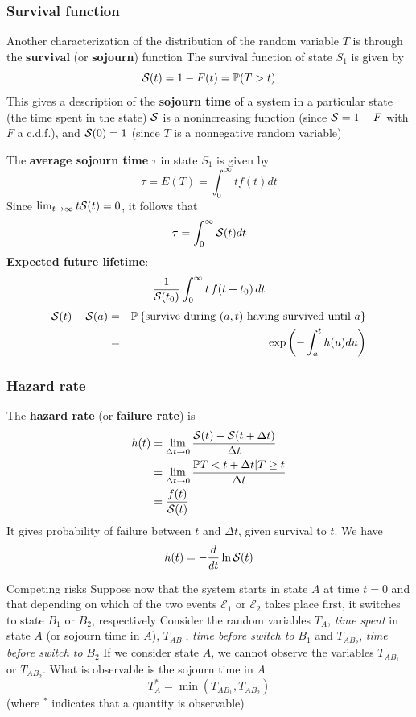 \documentclass[aspectratio=169]{beamer}\usepackage[]{graphicx}\usepackage[]{xcolor}
\begin{document}
\begin{frame}\frametitle{Survival function}
Another characterization of the distribution of the random variable
$T$ is through the \textbf{survival} (or \textbf{sojourn}) function
\vfill
The survival function of state $S_1$ is given by 
\begin{equation}
  \S(t)=1-F(t)=\IP(T>t)
  \label{eq:survival}
\end{equation}
This gives a description of the \textbf{sojourn time} of a
system in a particular state (the time spent in the state)
\vfill
$\S$ is a nonincreasing function (since $\S=1-F$
with $F$ a c.d.f.), and
$\S(0)=1$ (since $T$ is a nonnegative random variable)
\end{frame}

\begin{frame}
The \textbf{average sojourn time} $\tau$ in state $S_1$ is given by
\[
\tau=E(T)=\int_0^\infty tf(t)dt
\]
Since $\lim_{t\to\infty}t\S(t)=0$, it follows that 
\[
\tau=\int_0^\infty \S(t)dt
\]
\vfill
\textbf{Expected future lifetime}:
\[
\frac{1}{\S(t_0)} \int_0^{\infty} t\,f(t+t_0)\,dt 
\]
\vfill
\begin{eqnarray*}
\S(t)-\S(a)&=&\IP\left\{\textrm{survive during }
 (a,t)\textrm{ having survived until }a\right\} \\
&=& \exp\left(-\int_a^t h(u)du\right)
\end{eqnarray*}
\end{frame}

\begin{frame}\frametitle{Hazard rate}
The \textbf{hazard rate} (or \textbf{failure rate}) is
\begin{align*}
h(t) &= \lim_{\Delta t\to 0}\frac{\S(t)-\S(t+\Delta t)}{\Delta t} \\
& = \lim_{\Delta t\to 0} \frac{\IP{ T<t+\Delta t | T\geq
t}}{\Delta t} \\
&= \frac{f(t)}{\S(t)}
\end{align*}
It gives probability of failure between $t$ and $\Delta t$, given survival to $t$.
\vfill
We have
\[
h(t)=-\frac{d}{dt}\ln\S(t)
\]
\end{frame}

\begin{frame}{Competing risks}
Suppose now that the system starts in state $A$ at time $t=0$ and that depending on which of the two events $\mathcal{E}_1$ or $\mathcal{E}_2$ takes place first, it switches to state $B_1$ or $B_2$, respectively
\vfill
Consider the random variables $T_A$, \emph{time spent} in state $A$ (or sojourn time in $A$), $T_{AB_1}$, \emph{time before switch to} $B_1$ and $T_{AB_2}$, \emph{time before switch to} $B_2$
\vfill
If we consider state $A$, we cannot observe the variables $T_{AB_1}$ or $T_{AB_2}$. What is observable is the sojourn time in $A$
\[
T^*_A=\min\left( T_{AB_1},T_{AB_2} \right)
\]
(where $^*$ indicates that a quantity is observable)
\end{frame}
\end{document}
